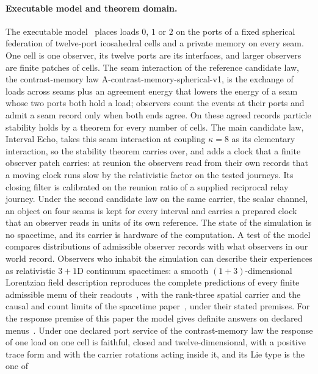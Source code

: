\documentclass[11pt]{article}
\begin{document}
\tableofcontents

\paragraph{Executable model and theorem domain.}
The executable model~\cite{ophmodel} places loads $0$, $1$ or $2$ on the
ports of a fixed spherical federation of twelve-port icosahedral cells and a
private memory on every seam. One cell is one observer, its twelve ports are
its interfaces, and larger observers are finite patches of cells. The seam
interaction of the reference candidate law, the contrast-memory law
A-contrast-memory-spherical-v1, is the exchange of loads across seams plus an
agreement energy that lowers the energy of a seam whose two ports both hold
a load; observers count the events at their ports and admit a seam record
only when both ends agree. On these agreed records particle stability holds by a theorem for every number of cells. The main candidate law, Interval Echo, takes this seam interaction at coupling $\kappa=8$ as its elementary interaction, so the stability theorem carries over, and adds a clock that a finite observer patch carries: at reunion the observers read from their own records that a moving clock runs slow by the relativistic factor on the tested journeys. Its closing filter is calibrated on the reunion ratio of a supplied reciprocal relay journey. Under the second candidate law on the same carrier, the scalar channel, an object on four seams is kept for every interval and carries a prepared clock that an observer reads in units of its own reference. The state of the simulation is no spacetime, and its
carrier is hardware of the computation. A test of the model compares
distributions of admissible observer records with what observers in our
world record. Observers who inhabit the simulation can describe their
experiences as relativistic $3{+}1$D continuum spacetimes: a smooth
$(1+3)$-dimensional Lorentzian field description reproduces the complete
predictions of every finite admissible menu of their
readouts~\cite{ophsynthesis,ophEinstein}, with the rank-three spatial
carrier and the causal and count limits of the spacetime
paper~\cite{ophEinstein}, under their stated premises. For the response
premise of this paper the model gives definite answers on declared
menus~\cite{ophmodel}. Under one declared port service of the contrast-memory
law the response of one load on one cell is
faithful, closed and twelve-dimensional, with a positive trace form and with
the carrier rotations acting inside it, and its Lie type is the one of
\end{document}
